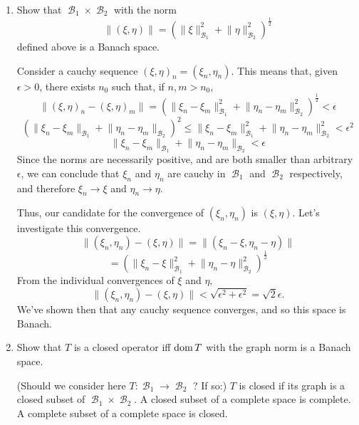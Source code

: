 \documentclass{article}
\theoremstyle{remark}
\newenvironment{exercise}[1]
  {\renewcommand\theinnerex{#1}\innerex}
  {\endinnerex}
\newcommand{\norm}[1]{\lVert #1 \rVert}
\DeclareMathOperator{\banach}{\mathcal{B}}
\begin{document}
\begin{exercise}{1.2.9}


    \begin{enumerate}

        \item Show that $\banach_1 \times \banach_2$ with the norm
              $$\norm{(\xi, \eta)} = \left(\norm{\xi}^2_{\banach_1} + \norm{\eta}^2_{\banach_2}\right)^{\frac{1}{2}}$$
              defined above is a Banach space.

              Consider a cauchy sequence $(\xi,\eta)_n=(\xi_n, \eta_n)$. This means that, given $\epsilon>0$, there exists $n_0$ such that, if $n, m > n_0$,
              $$ \norm{(\xi,\eta)_n - (\xi,\eta)_m} = \left(\norm{\xi_n - \xi_m}^2_{\banach_1} + \norm{\eta_n-\eta_m}^2_{\banach_2}\right)^{\frac{1}{2}} < \epsilon$$
              $$ \left(\norm{\xi_n-\xi_m}_{\banach_1} + \norm{\eta_n - \eta_m}_{\banach_2}\right)^2 \leq \norm{\xi_n-\xi_m}^2_{\banach_1} + \norm{\eta_n - \eta_m}^2_{\banach_2} < \epsilon^2$$
              $$ \norm{\xi_n-\xi_m}_{\banach_1} + \norm{\eta_n - \eta_m}_{\banach_2} < \epsilon$$
              Since the norms are necessarily positive, and are both smaller than arbitrary $\epsilon$, we can conclude that $\xi_n$ and $\eta_n$ are cauchy
              in $\banach_1$ and $\banach_2$ respectively, and therefore $\xi_n \to \xi$ and $\eta_n \to \eta$.

              Thus, our candidate for the convergence of $(\xi_n,\eta_n)$ is $(\xi,\eta)$. Let's investigate this convergence.
              $$ \norm{(\xi_n,\eta_n) - (\xi,\eta)} = \norm{(\xi_n-\xi,\eta_n-\eta)} $$
              $$ = \left(\norm{\xi_n-\xi}^2_{\banach_1} + \norm{\eta_n-\eta}^2_{\banach_2}\right)^{\frac{1}{2}}$$
              From the individual convergences of $\xi$ and $\eta$,
              $$ \norm{(\xi_n,\eta_n) - (\xi,\eta)} < \sqrt{\epsilon^2 + \epsilon^2} = \sqrt{2} \epsilon. $$
              We've shown then that any cauchy sequence converges, and so this space is Banach.


        \item Show that $T$ is a closed operator iff $\operatorname{dom} T$ with the graph norm is a Banach space.

              (Should we consider here $T: \banach_1 \to \banach_2$ ? If so:)
              $T$ is closed if its graph is a closed subset of $\banach_1 \times \banach_2$. A closed subset of a complete space is complete.
              A complete subset of a complete space is closed.
    \end{enumerate}

\end{exercise}
\end{document}
